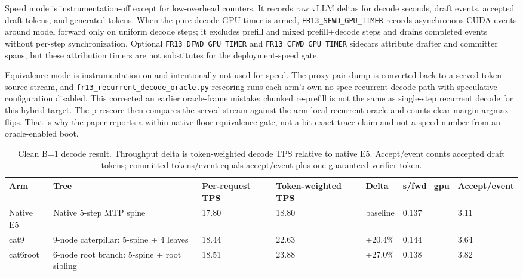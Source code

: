 \documentclass[conference]{IEEEtran}
\newcommand{\code}[1]{\texttt{#1}}
\newcommand{\rowsep}{\specialrule{0.15pt}{1.2pt}{1.2pt}}
\begin{document}
Speed mode is instrumentation-off except for low-overhead counters. It records raw vLLM deltas for decode seconds, draft events, accepted draft tokens, and generated tokens. When the pure-decode GPU timer is armed, \code{FR13\_SFWD\_GPU\_TIMER} records asynchronous CUDA events around model forward only on uniform decode steps; it excludes prefill and mixed prefill+decode steps and drains completed events without per-step synchronization. Optional \code{FR13\_DFWD\_GPU\_TIMER} and \code{FR13\_CFWD\_GPU\_TIMER} sidecars attribute drafter and committer spans, but these attribution timers are not substitutes for the deployment-speed gate.

Equivalence mode is instrumentation-on and intentionally not used for speed. The proxy pair-dump is converted back to a served-token source stream, and \code{fr13\_recurrent\_decode\_oracle.py} rescoring runs each arm's own no-spec recurrent decode path with speculative configuration disabled. This corrected an earlier oracle-frame mistake: chunked re-prefill is not the same as single-step recurrent decode for this hybrid target. The p-rescore then compares the served stream against the arm-local recurrent oracle and counts clear-margin argmax flips. That is why the paper reports a within-native-floor equivalence gate, not a bit-exact trace claim and not a speed number from an oracle-enabled boot.

\begin{table}[t]
\caption{Clean B=1 decode result. Throughput delta is token-weighted decode TPS relative to native E5. Accept/event counts accepted draft tokens; committed tokens/event equals accept/event plus one guaranteed verifier token.}
\label{tab:results}
\centering
\scriptsize
\begin{adjustbox}{width=\textwidth}
\begin{tabular}{L{0.15\textwidth} L{0.24\textwidth} C{0.10\textwidth} C{0.12\textwidth} C{0.09\textwidth} C{0.09\textwidth} C{0.09\textwidth}}
\toprule
Arm & Tree & Per-request TPS & Token-weighted TPS & Delta & s/fwd\_gpu & Accept/event \\
\midrule
Native E5 & Native 5-step MTP spine & 17.80 & 18.80 & baseline & 0.137 & 3.11 \\
\rowsep
cat9 & 9-node caterpillar: 5-spine + 4 leaves & 18.44 & 22.63 & +20.4\% & 0.144 & 3.64 \\
\rowsep
cat6root & 6-node root branch: 5-spine + root sibling & 18.51 & 23.88 & +27.0\% & 0.138 & 3.82 \\
\bottomrule
\end{tabular}
\end{adjustbox}
\end{table}
\end{document}
